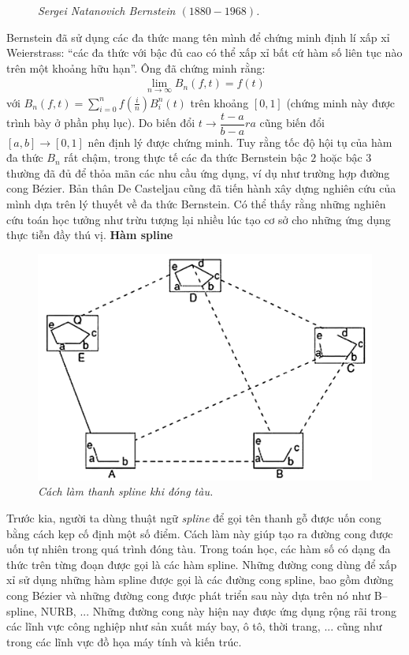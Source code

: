\begin{multicols}{2}
\begin{figure}[H]
			\caption{\small\textit{\color{toanhocdoisong}Sergei Natanovich Bernstein $(1880-1968)$.}}
			\vspace*{-10pt}
		\end{figure}
		Bernstein đã sử dụng các đa thức mang tên mình để chứng minh định lí xấp xỉ Weierstrass: ``các đa thức với bậc đủ cao có thể xấp xỉ bất cứ hàm số liên tục nào trên một khoảng hữu hạn''. Ông đã chứng minh rằng:
		\begin{align*}
			\mathop {\lim }\limits_{n \to \infty } {B_n}(f,t) = f(t)
		\end{align*}
		với $B_n(f,t) = \sum\limits_{i = 0}^n {f\left( {\frac{i}{n}} \right)B_i^n(t)}$ trên khoảng $[0,1]$ (chứng minh này được trình bày ở phần phụ lục). Do biến đổi $t \to \dfrac{t-a}{b-a}ra$ cũng biến đổi $[a,b] \to [0,1]$ nên định lý được chứng minh.
		\vskip 0.1cm
		Tuy rằng tốc độ hội tụ của hàm đa thức $B_n$ rất chậm, trong thực tế các đa thức Bernstein bậc $2$ hoặc bậc $3$ thường đã đủ để thỏa mãn các nhu cầu ứng dụng, ví dụ như trường hợp đường cong Bézier. Bản thân De Casteljau cũng đã tiến hành xây dựng nghiên cứu của mình dựa trên lý thuyết về đa thức Bernstein. Có thể thấy rằng những nghiên cứu toán học tưởng như trừu tượng lại nhiều lúc tạo cơ sở cho những ứng dụng thực tiễn đầy thú vị.
		\vskip 0.1cm
		\textbf{\color{toanhocdoisong}Hàm spline}
		\begin{figure}[H]
			\vspace*{-5pt}
			\centering
			\captionsetup{labelformat= empty, justification=centering}
			\includegraphics[width= 0.75\linewidth]{8}
			\caption{\small\textit{\color{toanhocdoisong}Cách làm thanh spline khi đóng tàu.}}
			\vspace*{-10pt}
		\end{figure}
		Trước kia, người ta dùng thuật ngữ \textit{spline} để gọi tên thanh gỗ được uốn cong bằng cách kẹp cố định một số điểm. Cách làm này giúp tạo ra đường cong được uốn tự nhiên trong quá trình đóng tàu. Trong toán học, các hàm số có dạng đa thức trên từng đoạn được gọi là các hàm spline. Những đường cong dùng để xấp xỉ sử dụng những hàm spline được gọi là các đường cong spline, bao gồm đường cong Bézier và những đường cong được phát triển sau này dựa trên nó như B--spline, NURB, ... Những đường cong này hiện nay được ứng dụng rộng rãi trong các lĩnh vực công nghiệp như sản xuất máy bay, ô tô, thời trang, ... cũng như trong các lĩnh vực đồ họa máy tính và kiến trúc.

\end{multicols}
